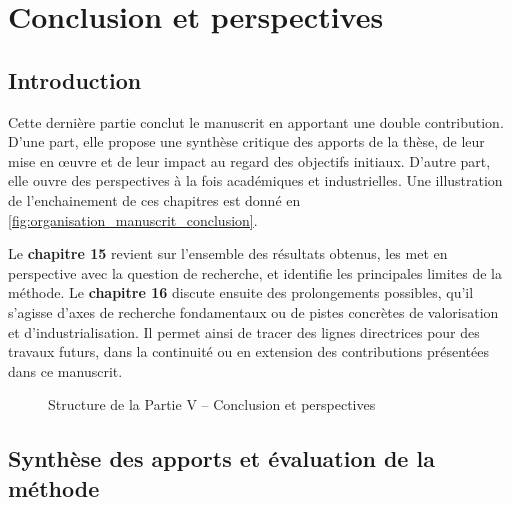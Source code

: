 \clearpage
\thispagestyle{empty}
\null
\newpage

\cleardoublepage
{}
\part{Conclusion et perspectives}

\clearpage
\thispagestyle{empty}
\null
\newpage

\chapter*{Introduction}
\label{part:conclusion}

Cette dernière partie conclut le manuscrit en apportant une double contribution. D’une part, elle propose une synthèse critique des apports de la thèse, de leur mise en œuvre et de leur impact au regard des objectifs initiaux. D’autre part, elle ouvre des perspectives à la fois académiques et industrielles. Une illustration de l'enchainement de ces chapitres est donné en \autoref{fig:organisation_manuscrit_conclusion}.

Le \textbf{chapitre 15} revient sur l'ensemble des résultats obtenus, les met en perspective avec la question de recherche, et identifie les principales limites de la méthode. Le \textbf{chapitre 16} discute ensuite des prolongements possibles, qu’il s’agisse d’axes de recherche fondamentaux ou de pistes concrètes de valorisation et d’industrialisation. Il permet ainsi de tracer des lignes directrices pour des travaux futurs, dans la continuité ou en extension des contributions présentées dans ce manuscrit.

\begin{figure}[h!]
    \centering
    \resizebox{\linewidth}{!}{%
        
    }
    \caption{Structure de la Partie V -- Conclusion et perspectives}
    \label{fig:organisation_manuscrit_conclusion}
\end{figure}

\clearpage
\thispagestyle{empty}
\null
\newpage

\chapter{Synthèse des apports et évaluation de la méthode}
\label{chap:synthese_evaluation}

